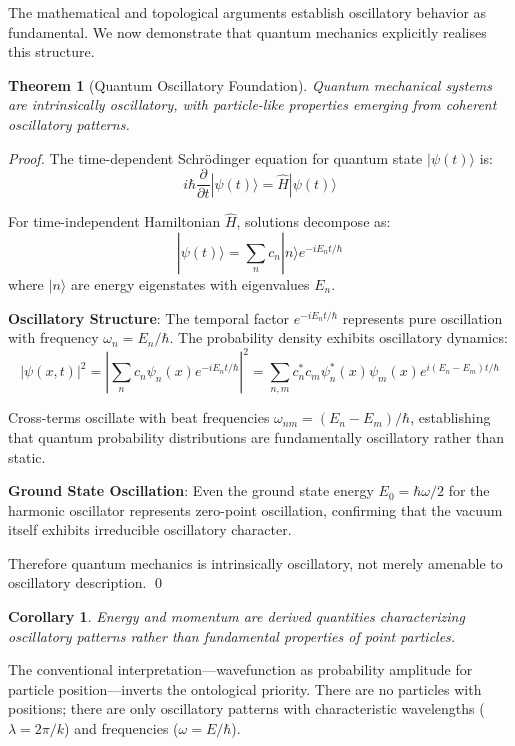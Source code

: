 \documentclass[12pt,a4paper]{article}
\newtheorem{corollary}{Corollary}
\newtheorem{theorem}{Theorem}
\begin{document}
The mathematical and topological arguments establish oscillatory behavior as fundamental. We now demonstrate that quantum mechanics explicitly realises this structure.

\begin{theorem}[Quantum Oscillatory Foundation]
\label{thm:quantum_oscillatory}
Quantum mechanical systems are intrinsically oscillatory, with particle-like properties emerging from coherent oscillatory patterns.
\end{theorem}

\begin{proof}
The time-dependent Schrödinger equation for quantum state $|\psi(t)\rangle$ is:
$$i\hbar \frac{\partial}{\partial t}|\psi(t)\rangle = \hat{H}|\psi(t)\rangle$$

For time-independent Hamiltonian $\hat{H}$, solutions decompose as:
$$|\psi(t)\rangle = \sum_n c_n |n\rangle e^{-iE_n t/\hbar}$$
where $|n\rangle$ are energy eigenstates with eigenvalues $E_n$.

\textbf{Oscillatory Structure}: The temporal factor $e^{-iE_n t/\hbar}$ represents pure oscillation with frequency $\omega_n = E_n/\hbar$. The probability density exhibits oscillatory dynamics:
$$|\psi(x,t)|^2 = \left|\sum_n c_n \psi_n(x) e^{-iE_n t/\hbar}\right|^2 = \sum_{n,m} c_n^* c_m \psi_n^*(x) \psi_m(x) e^{i(E_n - E_m)t/\hbar}$$

Cross-terms oscillate with beat frequencies $\omega_{nm} = (E_n - E_m)/\hbar$, establishing that quantum probability distributions are fundamentally oscillatory rather than static.

\textbf{Ground State Oscillation}: Even the ground state energy $E_0 = \hbar\omega/2$ for the harmonic oscillator represents zero-point oscillation, confirming that the vacuum itself exhibits irreducible oscillatory character.

Therefore quantum mechanics is intrinsically oscillatory, not merely amenable to oscillatory description. \qed
\end{proof}

\begin{corollary}
Energy and momentum are derived quantities characterizing oscillatory patterns rather than fundamental properties of point particles.
\end{corollary}

The conventional interpretation—wavefunction as probability amplitude for particle position—inverts the ontological priority. There are no particles with positions; there are only oscillatory patterns with characteristic wavelengths ($\lambda = 2\pi/k$) and frequencies ($\omega = E/\hbar$).
\end{document}
